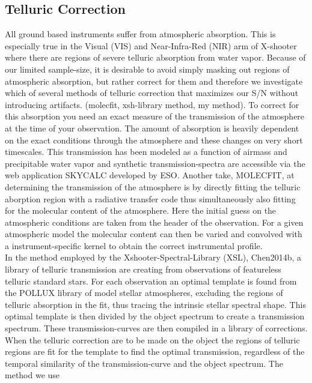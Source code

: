 \documentclass[iop]{emulateapj}
\begin{document}
\subsection{Telluric Correction}
All ground based instruments suffer from atmospheric absorption. This is especially true in the Visual (VIS) and Near-Infra-Red (NIR) arm of X-shooter where there are regions of severe telluric absorption from water vapor.  Because of our limited sample-size, it is desirable to avoid simply masking out regions of atmospheric absorption, but rather correct for them and therefore we investigate which of several methods of telluric correction that maximizes our S/N without introducing artifacts. (molecfit, xsh-library method, my method). To correct for this absorption you need an exact measure of the transmission of the atmosphere at the time of your observation. The amount of absorption is heavily dependent on the exact conditions through the atmosphere and these changes on very short timescales. This transmission has been modeled as a function of airmass and precipitable water vapor and synthetic transmission-spectra are accessible via the web application SKYCALC developed by ESO.  Another take, MOLECFIT, at determining the transmission of the atmosphere is by directly fitting the telluric aborption region with a radiative transfer code thus simultaneously also fitting for the molecular content of the atmosphere. Here the initial guess on the atmospheric conditions are taken from the header of the observation. For a given atmospheric model the molecular content can then be varied and convolved with a instrument-specific kernel to obtain the correct instrumental profile. \\
In the method employed by the Xshooter-Spectral-Library (XSL), Chen2014b, a library of telluric transmission are creating from observations of featureless telluric standard stars. For each observation an optimal template is found from the POLLUX library of model stellar atmospheres, excluding the regions of telluric absorption in the fit, thus tracing the intrinsic stellar spectral shape. This optimal template is then divided by the object spectrum to create a transmission spectrum. These transmission-curves are then compiled in a library of corrections. When the telluric correction are to be made on the object the regions of telluric regions are fit for the template to find the optimal transmission, regardless of the temporal similarity of the transmission-curve and the object spectrum. The method we use
\end{document}
